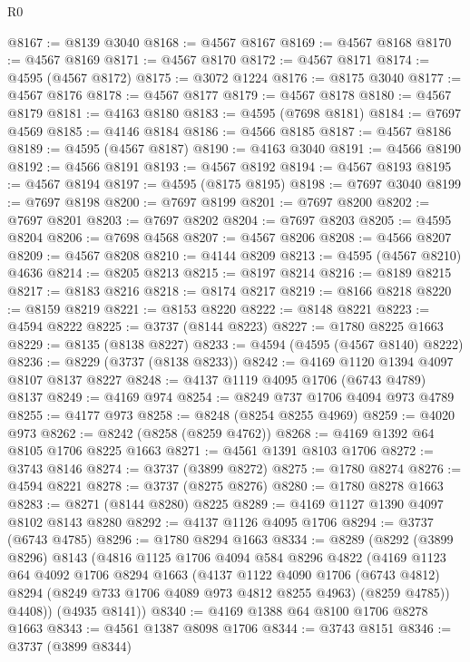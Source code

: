 \begin{lexlean}{R0}
\begin{coremodule}
@8167 := @8139 @3040
@8168 := @4567 @8167
@8169 := @4567 @8168
@8170 := @4567 @8169
@8171 := @4567 @8170
@8172 := @4567 @8171
@8174 := @4595 (@4567 @8172)
@8175 := @3072 @1224
@8176 := @8175 @3040
@8177 := @4567 @8176
@8178 := @4567 @8177
@8179 := @4567 @8178
@8180 := @4567 @8179
@8181 := @4163 @8180
@8183 := @4595 (@7698 @8181)
@8184 := @7697 @4569
@8185 := @4146 @8184
@8186 := @4566 @8185
@8187 := @4567 @8186
@8189 := @4595 (@4567 @8187)
@8190 := @4163 @3040
@8191 := @4566 @8190
@8192 := @4566 @8191
@8193 := @4567 @8192
@8194 := @4567 @8193
@8195 := @4567 @8194
@8197 := @4595 (@8175 @8195)
@8198 := @7697 @3040
@8199 := @7697 @8198
@8200 := @7697 @8199
@8201 := @7697 @8200
@8202 := @7697 @8201
@8203 := @7697 @8202
@8204 := @7697 @8203
@8205 := @4595 @8204
@8206 := @7698 @4568
@8207 := @4567 @8206
@8208 := @4566 @8207
@8209 := @4567 @8208
@8210 := @4144 @8209
@8213 := @4595 (@4567 @8210) @4636
@8214 := @8205 @8213
@8215 := @8197 @8214
@8216 := @8189 @8215
@8217 := @8183 @8216
@8218 := @8174 @8217
@8219 := @8166 @8218
@8220 := @8159 @8219
@8221 := @8153 @8220
@8222 := @8148 @8221
@8223 := @4594 @8222
@8225 := @3737 (@8144 @8223)
@8227 := @1780 @8225 @1663
@8229 := @8135 (@8138 @8227)
@8233 := @4594 (@4595 (@4567 @8140) @8222)
@8236 := @8229 (@3737 (@8138 @8233))
@8242 := @4169 @1120 @1394 @4097 @8107 @8137 @8227
@8248 := @4137 @1119 @4095 @1706 (@6743 @4789) @8137
@8249 := @4169 @974
@8254 := @8249 @737 @1706 @4094 @973 @4789
@8255 := @4177 @973
@8258 := @8248 (@8254 @8255 @4969)
@8259 := @4020 @973
@8262 := @8242 (@8258 (@8259 @4762))
@8268 := @4169 @1392 @64 @8105 @1706 @8225 @1663
@8271 := @4561 @1391 @8103 @1706
@8272 := @3743 @8146
@8274 := @3737 (@3899 @8272)
@8275 := @1780 @8274
@8276 := @4594 @8221
@8278 := @3737 (@8275 @8276)
@8280 := @1780 @8278 @1663
@8283 := @8271 (@8144 @8280) @8225
@8289 := @4169 @1127 @1390 @4097 @8102 @8143 @8280
@8292 := @4137 @1126 @4095 @1706
@8294 := @3737 (@6743 @4785)
@8296 := @1780 @8294 @1663
@8334 := @8289
    (@8292
      (@3899 @8296)
      @8143
      (@4816
        @1125
        @1706
        @4094
        @584
        @8296
        @4822
        (@4169
          @1123
          @64
          @4092
          @1706
          @8294
          @1663
          (@4137
            @1122
            @4090
            @1706
            (@6743 @4812)
            @8294
            (@8249 @733 @1706 @4089 @973 @4812 @8255 @4963)
            (@8259 @4785))
          @4408))
      (@4935 @8141))
@8340 := @4169 @1388 @64 @8100 @1706 @8278 @1663
@8343 := @4561 @1387 @8098 @1706
@8344 := @3743 @8151
@8346 := @3737 (@3899 @8344)

\end{coremodule}
\end{lexlean}
